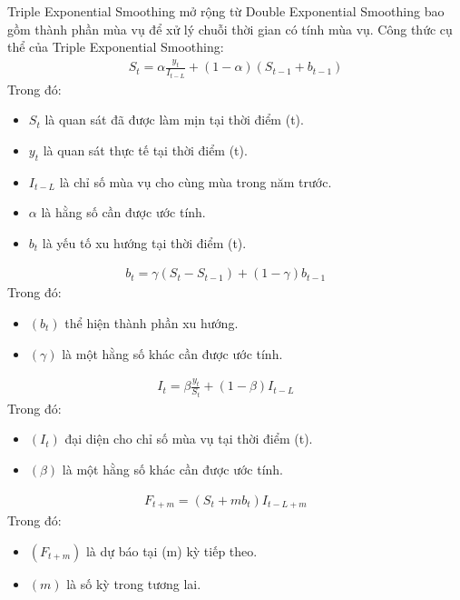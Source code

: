 \documentclass[conference]{IEEEtran}
\begin{document}
Triple Exponential Smoothing mở rộng từ Double Exponential Smoothing bao gồm thành phần mùa vụ để xử lý chuỗi thời gian có tính mùa vụ. Công thức cụ thể của Triple Exponential Smoothing: \cite{HoltWinter3}
\begin{align*}
    S_t = \alpha \frac{y_t}{I_{t-L}} + (1-\alpha)(S_{t-1}+b_{t-1}) 
\end{align*}
Trong đó:
\begin{itemize}
\item $S_t$ là quan sát đã được làm mịn tại thời điểm (t).
\item $y_t$ là quan sát thực tế tại thời điểm (t).
\item $I_{t-L}$ là chỉ số mùa vụ cho cùng mùa trong năm trước.
\item $\alpha$ là hằng số cần được ước tính.
\item $b_t$ là yếu tố xu hướng tại thời điểm (t).
\end{itemize}
\begin{align*}
b_t = \gamma (S_t - S_{t-1}) + (1 - \gamma)b_{t-1} & &
\end{align*}
Trong đó:
\begin{itemize}
\item $(b_t)$ thể hiện thành phần xu hướng.
\item $(\gamma)$ là một hằng số khác cần được ước tính.
\end{itemize}
\begin{align*}
 I_t = \beta \frac{y_t}{S_t} + (1 - \beta) I_{t-L} & &
\end{align*}
Trong đó:
\begin{itemize}
\item $(I_t)$ đại diện cho chỉ số mùa vụ tại thời điểm (t).
\item $(\beta)$ là một hằng số khác cần được ước tính.
\end{itemize}
\begin{align*}
F_{t+m} = (S_t + m b_t) I_{t-L+m} & &
\end{align*}
Trong đó:
\begin{itemize}
\item $(F_{t+m})$ là dự báo tại (m) kỳ tiếp theo.
\item $(m)$ là số kỳ trong tương lai.
\end{itemize}
\end{document}
